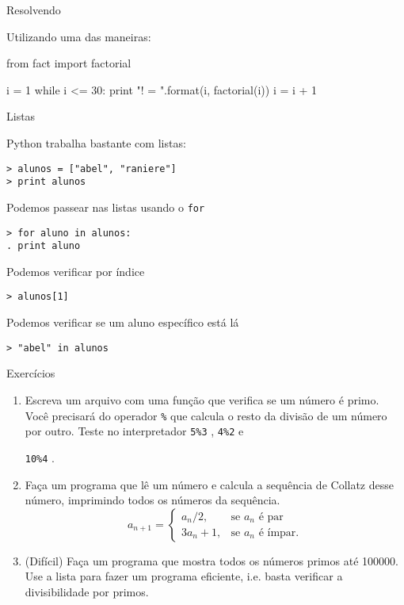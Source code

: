 \documentclass[12pt]{article}
\newcommand{\iframe}[1]{
\Large
\begin{center}
#1
\end{center}
}
\newcommand{\iframeend}{ \vfill \newpage}
\newcommand{\aframe}[1]{
\Large
\begin{center}
#1
\end{center}
\vfill
\newpage
}
\newcommand{\tit}[1]{
{\LARGE \color{green} #1}
\\ \vspace{0.5cm}
\vfill
}
\newcommand{\cmdpy}[1]{
\begin{flushleft}
{\color{yellow} \tt > #1 }\\
\end{flushleft}
}
\newcommand{\inline}[1]{
{\color{yellow} \tt #1} }
\begin{document}
\iframe{
  \tit{Resolvendo}
  Utilizando uma das maneiras:
}
\begin{file}
from fact import factorial

i = 1
while i <= 30:
  print "{}! = {}".format(i, factorial(i))
  i = i + 1
\end{file}
\iframeend

\aframe{
  \tit{Listas}
  Python trabalha bastante com listas:
  \cmdpy{alunos = ["abel", "raniere"] \\
  > print alunos}
  Podemos passear nas listas usando o \inline{for}
  \cmdpy{for aluno in alunos: \\
  . \qquad print aluno}
  Podemos verificar por índice
  \cmdpy{alunos[1]}
  Podemos verificar se um aluno específico está lá
  \cmdpy{"abel" in alunos}
}

\aframe{
  \tit{Exercícios}
  \begin{enumerate}
    \item Escreva um arquivo com uma função que verifica se um número é primo.
      Você precisará do operador \inline{\%} que calcula o resto da divisão de
      um número por outro. Teste no interpretador \inline{5\%3}, \inline{4\%2} e
      \inline{10\%4}.
    \item Faça um programa que lê um número e calcula a sequência de Collatz
      desse número, imprimindo todos os números da sequência.
      $$
        a_{n+1} = \left\{\begin{array}{ll}
            a_n/2, & \mbox{se } a_n \mbox{ é par} \\
            3a_n + 1, & \mbox{se } a_n \mbox{ é ímpar}.
        \end{array}\right.
      $$
    \item (Difícil) Faça um programa que mostra todos os números primos até
      100000. Use a lista para fazer um programa eficiente, i.e. basta verificar
      a divisibilidade por primos.
  \end{enumerate}
}
\end{document}
